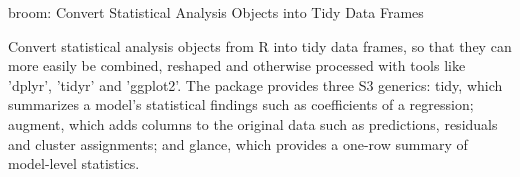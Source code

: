 broom: Convert Statistical Analysis Objects into Tidy Data Frames

Convert statistical analysis objects from R into tidy data frames, so that they can more easily be combined, reshaped and otherwise processed with tools like 'dplyr', 'tidyr' and 'ggplot2'. The package provides three S3 generics: tidy, which summarizes a model's statistical findings such as coefficients of a regression; augment, which adds columns to the original data such as predictions, residuals and cluster assignments; and glance, which provides a one-row summary of model-level statistics.
